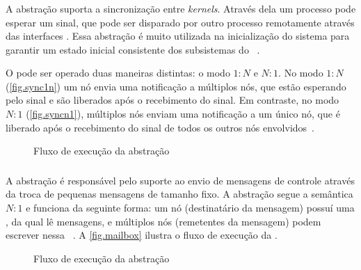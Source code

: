 \subsubsection{\sync}

A abstração \sync suporta a sincronização entre \textit{kernels}. Através dela um processo pode esperar um sinal, que pode ser disparado por outro processo remotamente através das interfaces \noc. Essa abstração é muito utilizada na inicialização do sistema para garantir um estado inicial consistente dos subsistemas do \os~\cite{penna:thesis}.

O \sync pode ser operado duas maneiras distintas: o modo $1:N$ e $N:1$. No modo $1:N$ (\autoref{fig.sync1n}) um nó envia uma notificação a múltiplos nós, que estão esperando pelo sinal e são liberados após o recebimento do sinal. Em contraste, no modo $N:1$ (\autoref{fig.syncn1}), múltiplos nós enviam uma notificação a um único nó, que é liberado após o recebimento do sinal de todos os outros nós envolvidos~\cite{penna:thesis}.

\begin{figure}[t]
    \centering
    
    \caption{Fluxo de execução da abstração \mailbox~\cite{penna:thesis}}
    \label{fig.mailbox}
\end{figure}

\subsubsection{\mailbox}

A abstração \mailbox é responsável pelo suporte ao envio de mensagens de controle através da troca de pequenas mensagens de tamanho fixo. A abstração segue a semântica $N:1$ e funciona da seguinte forma: um nó (destinatário da mensagem) possuí uma \mailbox, da qual lê mensagens, e múltiplos nós (remetentes da mensagem) podem escrever nessa \mailbox~\cite{penna:thesis}. A \autoref{fig.mailbox} ilustra o fluxo de execução da \mailbox.

\begin{figure}[t]
    \centering
    
    \caption{Fluxo de execução da abstração \portal \cite{penna:thesis}}\label{fig.portal}
\end{figure}

\subsubsection{\portal}

